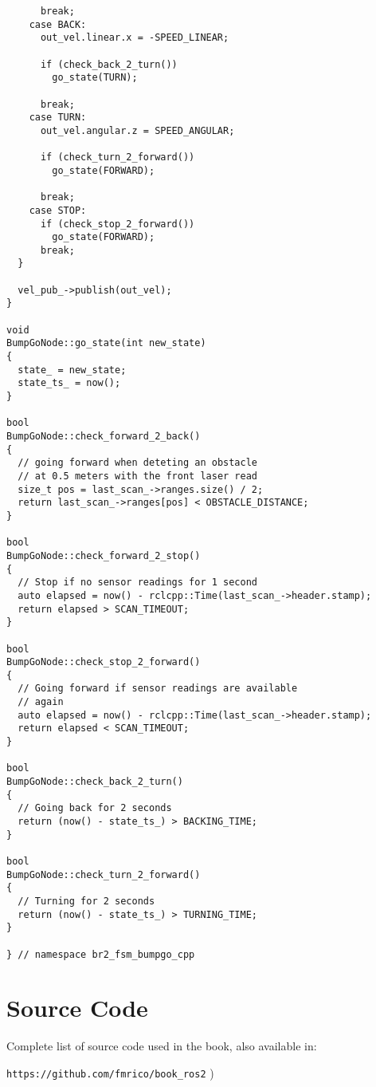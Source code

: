 \begin{tcolorbox}[sharp corners, colframe=gray!80, colback=LightGray, left=0pt, top=0pt, bottom=0pt, title=\texttt{br2\_fsm\_bumpgo\_cpp/src/br2\_fsm\_bumpgo\_cpp/BumpGoNode.cpp}]
\begin{verbatim}
      break; 
    case BACK: 
      out_vel.linear.x = -SPEED_LINEAR; 

      if (check_back_2_turn())
        go_state(TURN); 

      break; 
    case TURN: 
      out_vel.angular.z = SPEED_ANGULAR; 

      if (check_turn_2_forward())
        go_state(FORWARD); 

      break; 
    case STOP: 
      if (check_stop_2_forward()) 
        go_state(FORWARD); 
      break; 
  }

  vel_pub_->publish(out_vel); 
} 

void
BumpGoNode::go_state(int new_state) 
{ 
  state_ = new_state; 
  state_ts_ = now(); 
} 

bool   
BumpGoNode::check_forward_2_back()   
{ 
  // going forward when deteting an obstacle 
  // at 0.5 meters with the front laser read 
  size_t pos = last_scan_->ranges.size() / 2; 
  return last_scan_->ranges[pos] < OBSTACLE_DISTANCE; 
} 
    
bool 
BumpGoNode::check_forward_2_stop() 
{ 
  // Stop if no sensor readings for 1 second
  auto elapsed = now() - rclcpp::Time(last_scan_->header.stamp);
  return elapsed > SCAN_TIMEOUT; 
} 

bool   
BumpGoNode::check_stop_2_forward() 
{ 
  // Going forward if sensor readings are available 
  // again
  auto elapsed = now() - rclcpp::Time(last_scan_->header.stamp);
  return elapsed < SCAN_TIMEOUT; 
} 

bool 
BumpGoNode::check_back_2_turn() 
{ 
  // Going back for 2 seconds
  return (now() - state_ts_) > BACKING_TIME; 
} 
  
bool 
BumpGoNode::check_turn_2_forward() 
{ 
  // Turning for 2 seconds 
  return (now() - state_ts_) > TURNING_TIME; 
} 

} // namespace br2_fsm_bumpgo_cpp     \end{verbatim}
    \end{tcolorbox}
  \normalsize



\appendix

\chapter[Source Code]{Source Code}
\label{cap:source}
Complete list of source code used in the book, also available in:

\vspace{0.5cm}
\large
\texttt{https://github.com/fmrico/book\_ros2}
\normalsize
)
